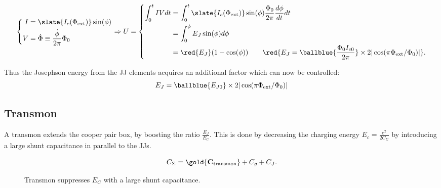 \begin{itemize}
  \begin{equation}
    \left\{\begin{aligned}
        I &= \slate{I_c(\Phi_\text{ext})}\sin(\phi)\\
        V&=\dot{\Phi} \equiv \frac{\dot{\phi}}{2\pi}\Phi_0
      \end{aligned}\right.  \Rightarrow U =
    \left\{
      \begin{aligned}
        \int_{0}^{t}IV dt & = \int_{0}^{t}\slate{I_c(\Phi_\text{ext})}\sin(\phi)\frac{\Phi_0}{2\pi}\frac{d\phi}{dt}dt\\
        & = \int_{0}^{\phi} E_J\sin(\phi)d\phi\\
        &     =     \red{E_J}(1-\cos(\phi))    \qquad     \red{E_J     =
          \ballblue{\frac{\Phi_0I_{c0}}{2\pi}}                    \times
          2|\cos(\pi\Phi_\text{ext}/\Phi_0)|}.
      \end{aligned}\right.
  \end{equation}
  \begin{framed}\noindent
    Thus  the  Josephson  energy  from   the  JJ  elements  acquires  an
    additional factor which can now be controlled:
    \begin{equation}
      E_J = \ballblue{E_{J0}} \times 2|\cos(\pi\Phi_\text{ext}/\Phi_0)|
    \end{equation}
  \end{framed}
\end{itemize}

\subsection{Transmon}
\label{sec:transmon}

A  transmon  extends  the  cooper   pair  box,  by  boosting  the  ratio
$\frac{E_{J}}{E_{C}}$.  This  is done by decreasing  the charging energy
$E_c= \frac{e^2}{2C_\Sigma}$ by introducing a large shunt capacitance in
parallel to the JJs.

\begin{framed}\noindent
  \begin{equation}
    C_{\Sigma} =  \gold{\mathbf{C_\text{transmon}}} + C_g  + C_J.
  \end{equation}
\end{framed}

\begin{figure}[h]
  \centering {}
  \caption{\small  Transmon  suppresses  $E_{C}$   with  a  large  shunt
    capacitance. \label{fig:cooper_pair_box_4_transmon}}
\end{figure}

